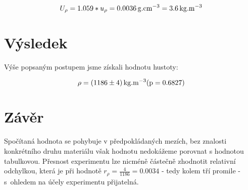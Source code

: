 \documentclass[czech,11pt,a4paper]{article}
\begin{document}
	\begin{equation*}
		U_{ \rho } = 1.059 * u_{\rho} =   0.0036 \,\rm g .cm^{-3}=  3.6 \,\rm kg.m^{-3}
	\end{equation*}
	
	\section{Výsledek}
	Výše popsaným postupem jsme získali hodnotu hustoty:
	
	\begin{equation*}
		\rho = (1186 \pm 4) \,\rm kg.m^{-3} (p = 0.6827)  
	\end{equation*}
	
	\section{Závěr}
	Spočítaná hodnota se pohybuje v předpokládaných mezích, bez znalosti konkrétního druhu materiálu však hodnotu nedokážeme porovnat s hodnotou tabulkovou. Přesnost experimentu lze nicméně částečně zhodnotit relativní odchylkou, která je při hodnotě $ r_{\rho} = \frac {4}{1186} = 0.0034$ - tedy kolem tří promile - s~ohledem na účely experimentu přijatelná.  
	
	
	
\end{document}
